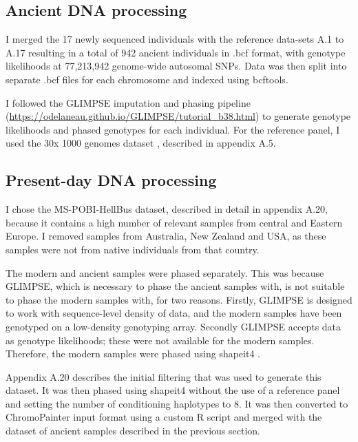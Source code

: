 \subsection{Ancient DNA processing} \label{AncientDNAprocessing}

I merged the 17 newly sequenced individuals with the reference data-sets A.1 to A.17 resulting in a total of 942 ancient individuals in .bcf format, with genotype likelihoods at 77,213,942 genome-wide autosomal SNPs. Data was then split into separate .bcf files for each chromosome and indexed using bcftools.

I followed the GLIMPSE \cite{rubinacci2021efficient} imputation and phasing pipeline (\url{https://odelaneau.github.io/GLIMPSE/tutorial_b38.html}) to generate genotype likelihoods and phased genotypes for each individual. For the reference panel, I used the 30x 1000 genomes dataset \cite{byrska2021high}, described in appendix A.5.  

\subsection{Present-day DNA processing} \label{PresentdayDNAprocessing}

I chose the MS-POBI-HellBus dataset, described in detail in appendix A.20, because it contains a high number of relevant samples from central and Eastern Europe. I removed samples from Australia, New Zealand and USA, as these samples were not from native individuals from that country.  

The modern and ancient samples were phased separately. This was because GLIMPSE, which is necessary to phase the ancient samples with, is not suitable to phase the modern samples with, for two reasons. Firstly, GLIMPSE is designed to work with sequence-level density of data, and the modern samples have been genotyped on a low-density genotyping array. Secondly GLIMPSE accepts data as genotype likelihoods; these were not available for the modern samples. Therefore, the modern samples were phased using shapeit4 \cite{delaneau2018integrative}.

Appendix A.20 describes the initial filtering that was used to generate this dataset. It was then phased using shapeit4 \cite{delaneau2018integrative} without the use of a reference panel and setting the number of conditioning haplotypes to 8. It was then converted to ChromoPainter input format using a custom R script and merged with the dataset of ancient samples described in the previous section.

